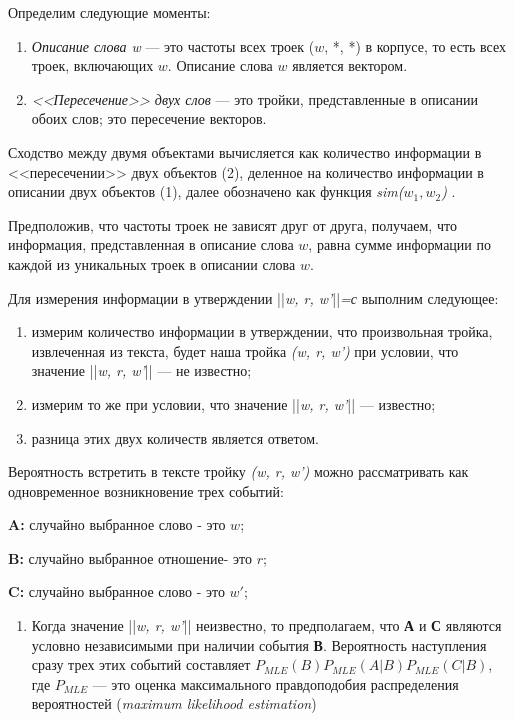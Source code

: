 \documentclass{article}
\begin{document}
\begin{articletext}
Определим следующие моменты:
\begin{enumerate} 
\item \textit{Описание слова w} --- это частоты всех троек ($w$, *, *) в корпусе,  то есть всех троек, включающих $w$. Описание слова $w$ является вектором.
\item \textit{<<Пересечение>> двух слов} --- это тройки, представленные в описании обоих слов; это пересечение векторов.
\end{enumerate}

Сходство между двумя объектами вычисляется как количество информации в <<пересечении>> двух объектов (2), деленное на количество информации в описании двух объектов (1), далее обозначено как функция \textit{sim($w_1, w_2$)} \cite{Dekang 1997}.

Предположив, что частоты троек не зависят друг от друга, получаем, что информация, представленная в описание слова $w$, равна сумме информации по каждой из уникальных троек в описании слова $w$. 

Для измерения информации в утверждении ||\textit{w, r, w'}||\textit{=с} выполним следующее:

\begin{enumerate}
\item измерим количество информации в утверждении, что произвольная тройка, извлеченная из текста, будет наша тройка \textit{(w, r, w')} при условии, что значение ||\textit{w, r, w'}|| --- не известно;
\item измерим то же при условии, что значение ||\textit{w, r, w'}|| --- известно;
\item разница этих двух количеств является ответом.
\end{enumerate}

Вероятность встретить в тексте тройку \textit{(w, r, w')} можно рассматривать как одновременное возникновение трех событий:

\textbf{A:} случайно выбранное слово - это $w$;

\textbf{B:} случайно выбранное отношение- это $r$;

\textbf{C:} случайно выбранное слово - это $w'$;

\begin{enumerate}
\item Когда значение ||\textit{w, r, w'}|| неизвестно, то предполагаем, что \textbf{А} и \textbf{С} являются условно независимыми при наличии события \textbf{В}.  Вероятность наступления сразу трех этих событий составляет \textbf{$P_{MLE}(B) P_{MLE} (A|B) P_{MLE} (C|B)$}, где \textbf{$P_{MLE}$} --- это оценка максимального правдоподобия распределения вероятностей (\textit{maximum likelihood estimation})


\end{enumerate}
\end{articletext}
\end{document}
